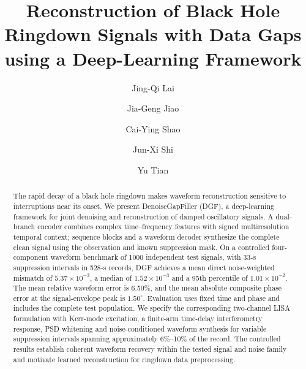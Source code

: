 \documentclass[10pt,prd,aps,a4paper,twocolumn,superscriptaddress,nofootinbib,floatfix]{revtex4-2}
\begin{document}
\title{Reconstruction of Black Hole Ringdown Signals with Data Gaps using a Deep-Learning Framework}
\author{Jing-Qi Lai}
\author{Jia-Geng Jiao}
\author{Cai-Ying Shao}

\author{Jun-Xi Shi}
\author{Yu Tian}

\begin{abstract}
The rapid decay of a black hole ringdown makes waveform reconstruction sensitive to interruptions near its onset. We present DenoiseGapFiller (DGF), a deep-learning framework for joint denoising and reconstruction of damped oscillatory signals. A dual-branch encoder combines complex time--frequency features with signed multiresolution temporal context; sequence blocks and a waveform decoder synthesize the complete clean signal using the observation and known suppression mask. On a controlled four-component waveform benchmark of 1000 independent test signals, with 33-s suppression intervals in 528-s records, DGF achieves a mean direct noise-weighted mismatch of $5.37\times10^{-3}$, a median of $1.52\times10^{-3}$ and a 95th percentile of $1.01\times10^{-2}$. The mean relative waveform error is 6.50\%, and the mean absolute composite phase error at the signal-envelope peak is $1.50^\circ$. Evaluation uses fixed time and phase and includes the complete test population. We specify the corresponding two-channel LISA formulation with Kerr-mode excitation, a finite-arm time-delay interferometry response, PSD whitening and noise-conditioned waveform synthesis for variable suppression intervals spanning approximately 6\%--10\% of the record. The controlled results establish coherent waveform recovery within the tested signal and noise family and motivate learned reconstruction for ringdown data preprocessing.
\end{abstract}
\end{document}
